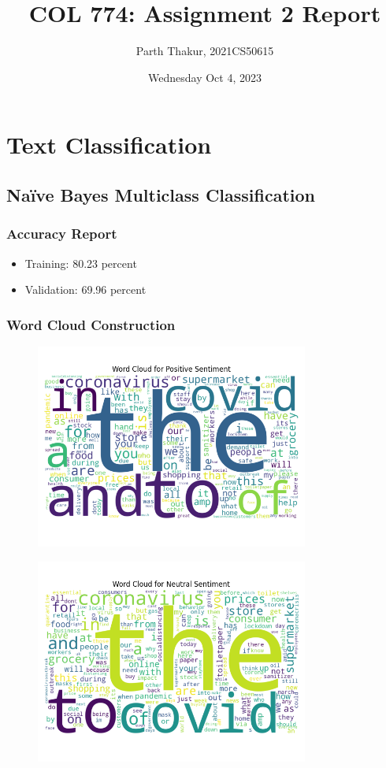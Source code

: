 \documentclass[12pt,a4paper]{article}
\title{COL 774: Assignment 2 Report}
\author{Parth Thakur, 2021CS50615}
\date{Wednesday Oct 4, 2023}
\begin{document}
\maketitle

\section{Text Classification}
\subsection{Naïve Bayes Multiclass Classification}
\subsubsection{Accuracy Report}
\begin{itemize}
    \item Training: 80.23 percent  
    \item Validation: 69.96 percent
\end{itemize}


\subsubsection{Word Cloud Construction}
\begin{figure}[H]
\centering
\includegraphics[width=0.8\textwidth]{Assignment 2/q1/wordcloud_Positive.png}
\end{figure}

\begin{figure}[H]
\centering
\includegraphics[width=0.8\textwidth]{Assignment 2/q1/wordcloud_Neutral.png}
\end{figure}
\end{document}
